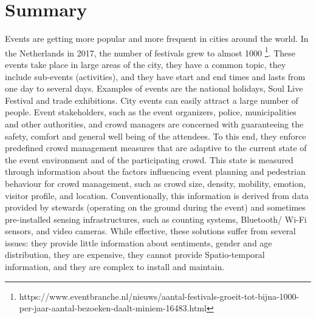 \chapter*{Summary}

\graphicspath{{./ch-x-others/images/}}

Events are getting more popular and more frequent in cities around the world. In the Netherlands in 2017, the number of festivals grew to almost 1000 \footnote{https://www.eventbranche.nl/nieuws/aantal-festivals-groeit-tot-bijna-1000-per-jaar-aantal-bezoeken-daalt-miniem-16483.html}. These events take place in large areas of the city, they have a common topic, they include sub-events (activities), and they have start and end times and lasts from one day to several days. Examples of events are the national holidays, Soul Live Festival and trade exhibitions. City events can easily attract a large number of people. Event stakeholders, such as the event organizers, police, municipalities and other authorities, and crowd managers are concerned with guaranteeing the safety, comfort and general well being of the attendees. To this end, they enforce predefined crowd management measures that are adaptive to the current state of the event environment and of the participating crowd. This state is measured through information about the factors influencing event planning \citep{li2019crowds} and pedestrian behaviour \citep{still2000crowd,tubbs2007egress,abbott2000event, zomer2015managing} for crowd management, such as crowd size, density, mobility, emotion, visitor profile, and location. Conventionally, this information is derived from data provided by stewards (operating on the ground during the event) and sometimes pre-installed sensing infrastructures, such as counting systems, Bluetooth/ Wi-Fi sensors, and video cameras. While effective, these solutions suffer from several issues: they provide little information about sentiments, gender and age distribution, they are expensive, they cannot provide Spatio-temporal information, and they are complex to install and maintain.  

